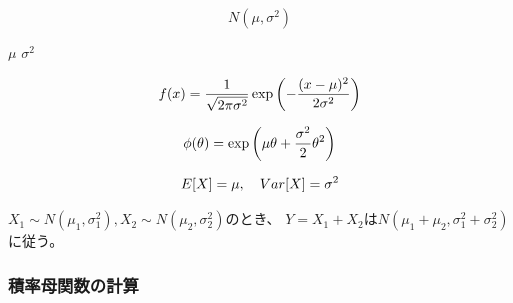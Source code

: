\begin{outline}[description]
  \1 [表記]
  \begin{equation}
    N(\mu, \sigma^2)
  \end{equation}
  
  \1 [パラメータ]
  \2
  \2 [平均] \(\mu\)
  \2 [分散] \(\sigma^2\)
  
  \1 [密度関数]
  \begin{equation}
    f (x) = \frac{1}{\sqrt{2\pi \sigma^2}} \exp \qty ( - \frac{(x - \mu)^2}{2 \sigma^2} )
  \end{equation}
  
  \1 [積率母関数]
  \begin{equation}
    \phi(\theta) = \exp \qty ( \mu \theta + \frac{\sigma^2}{2} \theta^2 )
  \end{equation}
  
  \1 [期待値・分散]
  \begin{equation}
    E \qty [X] = \mu, \quad Var \qty [ X ] = \sigma^2
  \end{equation}
  
  \1 [再生性]
  \(X_1 \sim N(\mu_1, \sigma_1^2), X_2 \sim N(\mu_2, \sigma_2^2)\)のとき、
  \(Y = X_1 + X_2\)は\(N(\mu_1 + \mu_2, \sigma_1^2 + \sigma_2^2)\)に従う。
  
\end{outline}

\subsubsection{積率母関数の計算}

